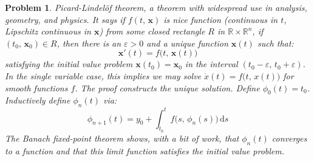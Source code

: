 \documentclass{article}
\theoremstyle{normal}
\newtheorem{problem}{Problem}
\begin{document}
\begin{problem}
        \textit{Picard-Lindel\"{o}f theorem}, a theorem with widespread use
        in analysis, geometry, and physics. It says if $f(t,\,\mathbf{x})$ is 
        \textit{nice} function (continuous in $t$, Lipschitz continuous in
        $\mathbf{x}$) from some closed rectangle $R$ in
        $\mathbb{R}\times\mathbb{R}^{n}$, if $(t_{0},\,\mathbf{x}_{0})\in{R}$,
        then there is an $\varepsilon>0$ and
        a unique function $\mathbf{x}(t)$ such that:
        \begin{equation}
            \mathbf{x}'(t)=f\big(t,\,\mathbf{x}(t)\big)
        \end{equation}
        satisfying the initial value problem $\mathbf{x}(t_{0})=\mathbf{x}_{0}$
        in the interval $(t_{0}-\varepsilon,\,t_{0}+\varepsilon)$.
        In the single variable case, this implies we may solve
        $\dot{x}(t)=f\big(t,\,x(t)\big)$ for smooth functions $f$. The proof
        constructs the unique solution. Define
        $\phi_{0}(t)=t_{0}$. Inductively define $\phi_{n}(t)$ via:
        \begin{equation}
            \phi_{n+1}(t)=y_{0}+\int_{t_{0}}^{t}f\big(s,\,\phi_{n}(s)\big)\,
                \textrm{d}s
        \end{equation}
        The Banach fixed-point theorem shows, with a bit of work, that
        $\phi_{n}(t)$ converges to a function and that this limit function
        satisfies the initial value problem.
    \end{problem}
\end{document}
